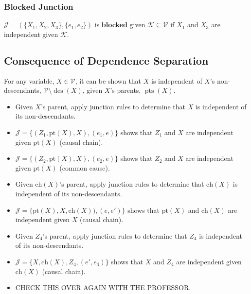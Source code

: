 \subsubsection{Blocked Junction}
\begin{definition}
    $\mathcal{J} = (\{X_1, X_2, X_3\}, \{e_1, e_2\})$ is \textbf{blocked} given $\mathcal{K} \subseteq \mathcal{V}$ if $X_1$ and $X_3$ are independent given $\mathcal{K}$.
\end{definition}

\subsection{Consequence of Dependence Separation}
\begin{theorem}
    For any variable, $X \in \mathcal{V}$, it can be shown that $X$ is independent of $X$'s non-descendants, $\mathcal{V} \setminus \operatorname{des}(X)$, given $X$'s parents, $\operatorname{pts}(X)$.
\end{theorem}

\begin{notes}
    \begin{itemize}
        \item Given $X$'s parent, apply junction rules to determine that $X$ is independent of its non-descendants.
        \item $\mathcal{J} = \{(Z_1, \text{pt}(X), X), (e_1,e)\}$ shows that $Z_1$ and $X$ are independent given $\text{pt}(X)$ (causal chain).
        \item $\mathcal{J} = \{(Z_2, \text{pt}(X), X), (e_2,e)\}$ shows that $Z_2$ and $X$ are independent given $\text{pt}(X)$ (common cause).
        \item Given $\text{ch}(X)$'s parent, apply junction rules to determine that $\text{ch}(X)$ is independent of its non-descendants.
        \item $\mathcal{J} = \{\text{pt}(X),X, \text{ch}(X)), (e,e')\}$ shows that $\text{pt}(X)$ and $\text{ch}(X)$ are independent given $X$ (causal chain).
        \item Given $Z_4$'s parent, apply junction rules to determine that $Z_4$ is independent of its non-descendants.
        \item $\mathcal{J} = \{X, \text{ch}(X), Z_4, (e',e_4)\}$ shows that $X$ and $Z_4$ are independent given $\text{ch}(X)$ (causal chain).
        \item CHECK THIS OVER AGAIN WITH THE PROFESSOR.
    \end{itemize}
\end{notes}
\newpage


